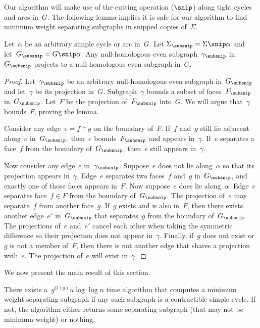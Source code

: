 Our algorithm will make use of the cutting operation ($\snip$) along tight cycles and arcs in~$G$. The following lemma implies it is safe for our algorithm to find minimum weight separating subgraphs in snipped copies of~$\Sigma$.
\begin{lemma}
\label{lem:global-cut_null-homologous-projections}
Let~$\alpha$ be an arbitrary simple cycle or arc in~$G$. Let\linebreak
${\Sigmasnip = \Sigma \snip \alpha}$ and let~$\Gsnip = G \snip \alpha$. Any null-homologous even subgraph~$\gammasnip$ in~$\Gsnip$ projects to a null-homologous even subgraph in~$G$.
\end{lemma}
\begin{proof}
Let~$\gammasnip$ be an arbitrary null-homologous even subgraph in~$\Gsnip$ and let~$\gamma$ be its projection in~$G$.
Subgraph~$\gamma$ bounds a subset of faces~$F_{\subsnip}$ in~$\Gsnip$. 
Let~$F$ be the projection of~$F_{\subsnip}$ into~$G$.
We will argue that~$\gamma$ bounds~$F$, proving the lemma.

Consider any edge~$e = f \uparrow g$ on the boundary of~$F$. If~$f$ and~$g$ still lie adjacent along~$e$ in~$\Gsnip$, then~$e$ bounds~$F_{\subsnip}$ and appears in~$\gamma$. If~$e$ separates a face~$f$ from the boundary of~$\Gsnip$, then~$e$ still appears in~$\gamma$.

Now consider any edge~$e$ in~$\gammasnip$. Suppose~$e$ does not lie along~$\alpha$ so that its projection appears in~$\gamma$. Edge~$e$ separates two faces~$f$ and~$g$ in~$\Gsnip$, and exactly one of those faces appears in~$F$. Now suppose~$e$ does lie along~$\alpha$. Edge~$e$ separates face~$f \in F$ from the boundary of~$\Gsnip$. The projection of~$e$ may separate~$f$ from another face~$g$. If~$g$ exists and is also in~$F$, then there exists another edge~$e'$ in~$\Gsnip$ that separates~$g$ from the boundary of~$\Gsnip$. The projections of~$e$ and~$e'$ cancel each other when taking the symmetric difference so their projection does not appear in~$\gamma$. Finally, if~$g$ does not exist or~$g$ is not a member of~$F$, then there is not another edge that shares a projection with~$e$. The projection of~$e$ will exist in~$\gamma$.
\end{proof}

We now present the main result of this section.
\begin{lemma}
\label{lem:contractible-alg}
There exists a~$g^{O(g)} n \log \log n$ time algorithm that computes a minimum weight separating subgraph if any such subgraph is a contractible simple cycle. If not, the algorithm either returns some separating subgraph (that may not be minimum weight) or nothing.
\end{lemma}

